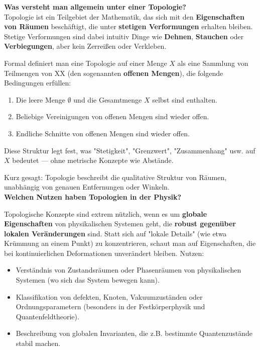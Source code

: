 \textbf{Was versteht man allgemein unter einer Topologie?} \\

Topologie ist ein Teilgebiet der Mathematik, das sich mit den \textbf{Eigenschaften von Räumen} beschäftigt, die unter \textbf{stetigen Verformungen} erhalten bleiben.
Stetige Verformungen sind dabei intuitiv Dinge wie \textbf{Dehnen}, \textbf{Stauchen} oder \textbf{Verbiegungen}, aber kein Zerreißen oder Verkleben.

Formal definiert man eine Topologie auf einer Menge $X$ als eine Sammlung von Teilmengen von XX (den sogenannten \textbf{offenen Mengen}), die folgende Bedingungen erfüllen:

\begin{enumerate}
    \item Die leere Menge $\emptyset$ und die Gesamtmenge $X$ selbst sind enthalten.
    \item Beliebige Vereinigungen von offenen Mengen sind wieder offen.
    \item Endliche Schnitte von offenen Mengen sind wieder offen.
\end{enumerate}

Diese Struktur legt fest, was "Stetigkeit", "Grenzwert", "Zusammenhang" usw. auf $X$ bedeutet — ohne metrische Konzepte wie Abstände.

Kurz gesagt:
Topologie beschreibt die qualitative Struktur von Räumen, unabhängig von genauen Entfernungen oder Winkeln.\\

\textbf{Welchen Nutzen haben Topologien in der Physik?}

Topologische Konzepte sind extrem nützlich, wenn es um \textbf{globale Eigenschaften} von physikalischen Systemen geht, die \textbf{robust gegenüber lokalen Veränderungen} sind.
Statt sich auf "lokale Details" (wie etwa Krümmung an einem Punkt) zu konzentrieren, schaut man auf Eigenschaften, die bei kontinuierlichen Deformationen unverändert bleiben.
Nutzen:
\begin{itemize}
    \item Verständnis von Zustandsräumen oder Phasenräumen von physikalischen Systemen (wo sich das System bewegen kann).
    \item Klassifikation von defekten, Knoten, Vakuumzuständen oder Ordnungsparametern (besonders in der Festkörperphysik und Quantenfeldtheorie).
    \item Beschreibung von globalen Invarianten, die z.B. bestimmte Quantenzustände stabil machen.
\end{itemize}

